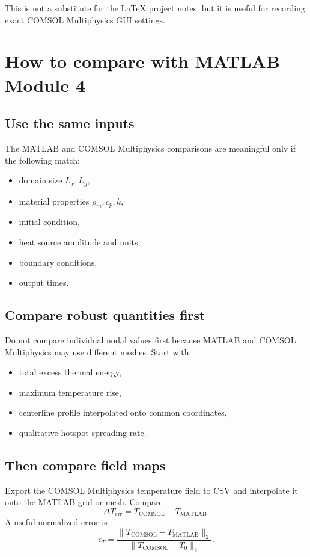\documentclass[11pt]{article}
\newcommand{\COMSOL}{COMSOL Multiphysics}
\newcommand{\comsol}{\COMSOL}
\begin{document}
This is not a substitute for the LaTeX project notes, but it is useful for recording exact \comsol{} GUI settings.

\section{How to compare with MATLAB Module 4}

\subsection{Use the same inputs}
The MATLAB and \comsol{} comparisons are meaningful only if the following match:
\begin{itemize}
\item domain size \(L_x,L_y\),
\item material properties \(\rho_m,c_p,k\),
\item initial condition,
\item heat source amplitude and units,
\item boundary conditions,
\item output times.
\end{itemize}

\subsection{Compare robust quantities first}
Do not compare individual nodal values first because MATLAB and \comsol{} may use different meshes.  Start with:
\begin{itemize}
\item total excess thermal energy,
\item maximum temperature rise,
\item centerline profile interpolated onto common coordinates,
\item qualitative hotspot spreading rate.
\end{itemize}

\subsection{Then compare field maps}
Export the \comsol{} temperature field to CSV and interpolate it onto the MATLAB grid or mesh.  Compare
\begin{equation}
\Delta T_{\mathrm{err}}=T_{\mathrm{COMSOL}}-T_{\mathrm{MATLAB}}.
\end{equation}
A useful normalized error is
\begin{equation}
\epsilon_T=\frac{\|T_{\mathrm{COMSOL}}-T_{\mathrm{MATLAB}}\|_2}{\|T_{\mathrm{COMSOL}}-T_0\|_2}.
\end{equation}
\end{document}
